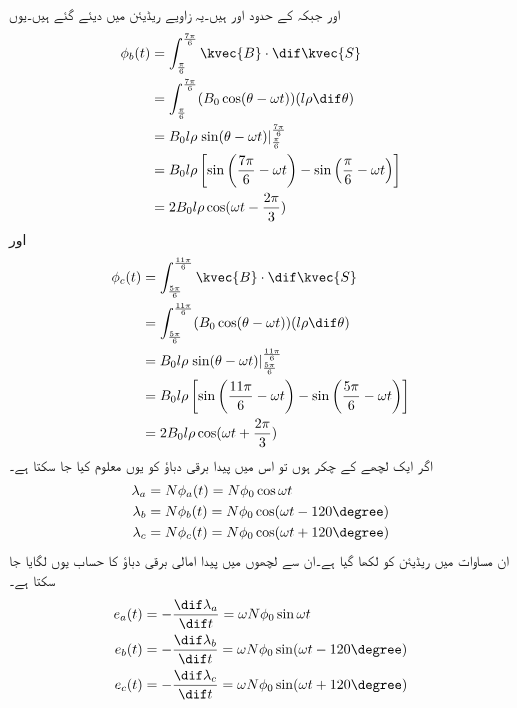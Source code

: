   اور  جبکہ  کے حدود  اور  ہیں۔یہ زاویے ریڈیئن میں دیئے گئے ہیں۔یوں
\begin{gather}
\begin{aligned}
\phi_b(t)&=\int_{\frac{\pi}{6}}^{\frac{7\pi}{6}} \kvec{B} \cdot \dif \kvec{S}\\
&=\int_{\frac{\pi}{6}}^{\frac{7\pi}{6}} (B_0 \cos (\theta-\omega t))(l \rho \dif \theta)\\
&=B_0 l \rho \left. \sin (\theta-\omega t) \right|_{\frac{\pi}{6}}^{\frac{7\pi}{6}}\\
&=B_0 l \rho \left[\sin \left(\frac{7\pi}{6}-\omega t \right )-\sin \left (\frac{\pi}{6}-\omega t \right) \right]\\
&=2 B_0 l \rho \cos (\omega t-\frac{2\pi}{3})
\end{aligned}
\end{gather}
اور
\begin{gather}
\begin{aligned}
\phi_c(t)&=\int_{\frac{5\pi}{6}}^{\frac{11\pi}{6}} \kvec{B} \cdot \dif \kvec{S}\\
&=\int_{\frac{5\pi}{6}}^{\frac{11\pi}{6}} (B_0 \cos (\theta-\omega t))(l \rho \dif \theta)\\
&=B_0 l \rho \left. \sin (\theta-\omega t) \right|_{\frac{5\pi}{6}}^{\frac{11\pi}{6}}\\
&=B_0 l \rho \left[\sin \left(\frac{11\pi}{6}-\omega t \right )-\sin \left (\frac{5\pi}{6}-\omega t \right) \right]\\
&=2 B_0 l \rho \cos (\omega t+\frac{2\pi}{3})
\end{aligned}
\end{gather}
اگر ایک لچھے کے  چکر ہوں تو اس میں پیدا برقی دباؤ کو یوں معلوم کیا جا سکتا ہے۔
\begin{gather}
\begin{aligned}
\lambda_a&=N \phi_a (t)=N \phi_0 \cos \omega t\\
\lambda_b&=N \phi_b (t)=N \phi_0 \cos (\omega t-120\degree)\\
\lambda_c&=N \phi_c (t)=N \phi_0 \cos (\omega t+120\degree)
\end{aligned}
\end{gather}
ان مساوات میں  ریڈیئن کو  لکھا گیا ہے۔ان سے لچھوں میں پیدا امالی برقی دباؤ کا حساب یوں لگایا جا سکتا ہے۔
\begin{gather}
\begin{aligned}
e_a(t)&=-\frac{\dif \lambda_a}{\dif t}=\omega N \phi_0 \sin \omega t\\
e_b(t)&=-\frac{\dif \lambda_b}{\dif t}=\omega N \phi_0 \sin (\omega t-120\degree)\\
e_c(t)&=-\frac{\dif \lambda_c}{\dif t}=\omega N \phi_0 \sin (\omega t+120\degree)
\end{aligned}
\end{gather}
